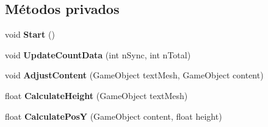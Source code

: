 \subsection*{Métodos privados}
\begin{DoxyCompactItemize}
\item 
\mbox{\label{class_state_message_control_adf8e104a97efb32e6d4fc5ada6cdd57d}} 
void {\bfseries Start} ()
\item 
\mbox{\label{class_state_message_control_a09f2f0b683668a6b87f01078626c1ee0}} 
void {\bfseries Update\+Count\+Data} (int n\+Sync, int n\+Total)
\item 
\mbox{\label{class_state_message_control_a251349ec61d12eff0a0dbb4871991c94}} 
void {\bfseries Adjust\+Content} (Game\+Object text\+Mesh, Game\+Object content)
\item 
\mbox{\label{class_state_message_control_a4ec35157d5b660616e1c8a7340d9f04d}} 
float {\bfseries Calculate\+Height} (Game\+Object text\+Mesh)
\item 
\mbox{\label{class_state_message_control_a2f45459b571b7afcf4967d9bbca1f5b6}} 
float {\bfseries Calculate\+PosY} (Game\+Object content, float height)
\end{DoxyCompactItemize}
